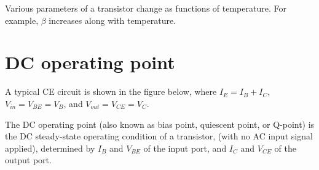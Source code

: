 

Various parameters of a transistor change as functions of temperature. 
For example, $\beta$ increases along with temperature.

\section*{DC operating point}

A typical CE circuit is shown in the figure below, where $I_E=I_B+I_C$,
$V_{in}=V_{BE}=V_B$, and $V_{out}=V_{CE}=V_C$.


The DC operating point (also known as bias point, quiescent point, 
or Q-point) is the DC steady-state operating condition of a transistor,
(with no AC input signal applied), determined by $I_B$ and $V_{BE}$ of 
the input port, and $I_C$ and $V_{CE}$ of the output port. 
